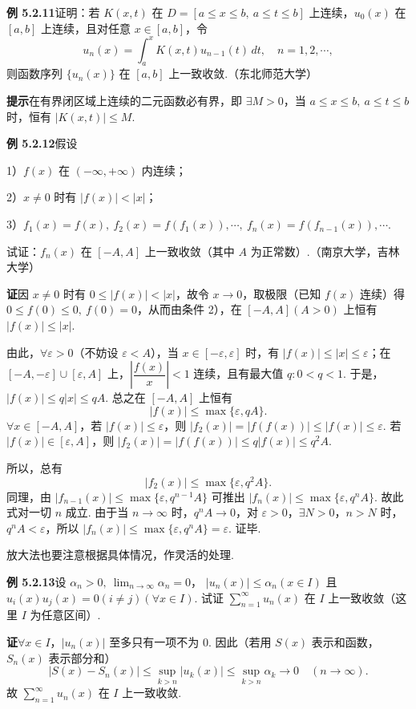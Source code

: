 \documentclass[UTF8, 12pt, fontset=fandol, oneside]{ctexart}
\begin{document}
\noindent\textbf{例 5.2.11}\quad 证明：若 $K(x,t)$ 在
$D=[a\le x\le b,\ a\le t\le b]$ 上连续，$u_0(x)$ 在 $[a,b]$ 上连续，且对任意
$x\in[a,b]$，令
\[
  u_n(x)=\int_a^x K(x,t)u_{n-1}(t)\,dt,\quad n=1,2,\cdots,
\]
则函数序列 $\{u_n(x)\}$ 在 $[a,b]$ 上一致收敛.（东北师范大学）

\noindent\textbf{提示}\quad 在有界闭区域上连续的二元函数必有界，即 $\exists M>0$，当
$a\le x\le b,\ a\le t\le b$ 时，恒有 $|K(x,t)|\le M$.

\noindent\textbf{例 5.2.12}\quad 假设

1）$f(x)$ 在 $(-\infty,+\infty)$ 内连续；

2）$x\ne0$ 时有 $|f(x)|<|x|$；

3）$f_1(x)=f(x),\ f_2(x)=f(f_1(x)),\cdots,\ f_n(x)=f(f_{n-1}(x)),\cdots$.

试证：$f_n(x)$ 在 $[-A,A]$ 上一致收敛（其中 $A$ 为正常数）.（南京大学，吉林大学）

\noindent\textbf{证}\quad 因 $x\ne0$ 时有 $0\le |f(x)|<|x|$，故令 $x\to0$，取极限（已知
$f(x)$ 连续）得 $0\le f(0)\le0,\ f(0)=0$，从而由条件 2），在
$[-A,A](A>0)$ 上恒有 $|f(x)|\le |x|$.

由此，$\forall\varepsilon>0$（不妨设 $\varepsilon<A$），当
$x\in[-\varepsilon,\varepsilon]$ 时，有 $|f(x)|\le |x|\le\varepsilon$；在
$[-A,-\varepsilon]\cup[\varepsilon,A]$ 上，$\left|\dfrac{f(x)}{x}\right|<1$ 连续，且有最大值
$q:0<q<1$. 于是，$|f(x)|\le q|x|\le qA$. 总之在 $[-A,A]$ 上恒有
\[
  |f(x)|\le\max\{\varepsilon,qA\}.
\]
$\forall x\in[-A,A]$，若 $|f(x)|\le\varepsilon$，则
$|f_2(x)|=|f(f(x))|\le |f(x)|\le\varepsilon$.
若 $|f(x)|\in[\varepsilon,A]$，则
$|f_2(x)|=|f(f(x))|\le q|f(x)|\le q^2A$.

所以，总有
\[
  |f_2(x)|\le\max\{\varepsilon,q^2A\}.
\]
同理，由 $|f_{n-1}(x)|\le\max\{\varepsilon,q^{n-1}A\}$ 可推出
$|f_n(x)|\le\max\{\varepsilon,q^nA\}$. 故此式对一切 $n$ 成立. 由于当
$n\to\infty$ 时，$q^nA\to0$，对 $\varepsilon>0$，$\exists N>0$，$n>N$ 时，
$q^nA<\varepsilon$，所以 $|f_n(x)|\le\max\{\varepsilon,q^nA\}=\varepsilon$. 证毕.

放大法也要注意根据具体情况，作灵活的处理.

\noindent\textbf{例 5.2.13}\quad 设 $\alpha_n>0,\ \lim_{n\to\infty}\alpha_n=0$，
$|u_n(x)|\le\alpha_n(x\in I)$ 且 $u_i(x)u_j(x)=0(i\ne j)(\forall x\in I)$. 试证
$\displaystyle\sum_{n=1}^{\infty}u_n(x)$ 在 $I$ 上一致收敛（这里 $I$ 为任意区间）.

\noindent\textbf{证}\quad $\forall x\in I$，$|u_n(x)|$ 至多只有一项不为 $0$. 因此（若用
$S(x)$ 表示和函数，$S_n(x)$ 表示部分和）
\[
  |S(x)-S_n(x)|\le \sup_{k>n}|u_k(x)|\le \sup_{k>n}\alpha_k\to0\quad(n\to\infty).
\]
故 $\displaystyle\sum_{n=1}^{\infty}u_n(x)$ 在 $I$ 上一致收敛.
\end{document}
